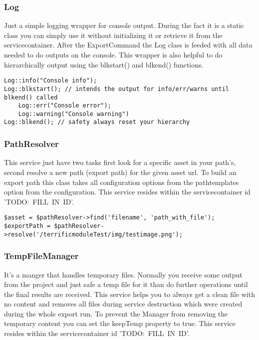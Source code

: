 \subsubsection{Log}
Just a simple logging wrapper for console output. During the fact it is a static class you can simply use it without initializing it or retrieve it from the servicecontainer. After the ExportCommand the Log class is feeded with all data needed to do outputs on the console. This wrapper is also helpful to do hierarchically output using the blkstart() and blkend() functions.

\begin{verbatim}
Log::info("Console info");
Log::blkstart(); // intends the output for info/err/warns until blkend() called
    Log::err("Console error");
    Log::warning("Console warning")
Log::blkend(); // safety always reset your hierarchy
\end{verbatim}

\subsubsection{PathResolver}
This service just have two tasks first look for a specific asset in your path's, second resolve a new path (export path) for the given asset url. To build an export path this class takes all configuration options from the pathtemplates option from the configuration. This service resides within the servicecontainer id \mbox{'TODO: FILL IN ID'}.

\begin{verbatim}
$asset = $pathResolver->find('filename', 'path_with_file');
$exportPath = $pathResolver->resolve('/terrificmoduleTest/img/testimage.png');
\end{verbatim}

\subsubsection{TempFileManager}
It's a manger that handles temporary files. Normally you receive some output from the project and just safe a temp file for it than do further operations until the final results are received. This service helps you to always get a clean file with no content and removes all files during service destruction which were created during the whole export run. To prevent the Manager from removing the temporary content you can set the keepTemp property to true. This service resides within the servicecontainer id \mbox{'TODO: FILL IN ID'}.

